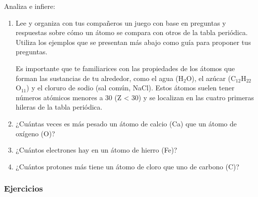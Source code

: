 \begin{minipage}{\textwidth}
    \begin{boxK}
        Analiza e infiere:
        \begin{enumerate}
            \item Lee y organiza con tus compañeros un juego con base en preguntas y respuestas sobre cómo un átomo se compara
                  con otros de la tabla periódica. Utiliza los ejemplos que se presentan más abajo como guía para proponer tus preguntas.

                  \begin{boxF}
                      Es importante que te familiarices con las propiedades de los átomos que forman las sustancias de tu alrededor,
                      como el agua (H$_2$O), el azúcar (C$_{12}$H$_{22}$O$_{11}$) y el cloruro de sodio (sal común, NaCl).
                      Estos átomos suelen tener números atómicos menores a 30 (Z < 30) y se localizan en las cuatro primeras hileras de
                      la tabla periódica.
                  \end{boxF}
            \item ¿Cuántas veces es más pesado un átomo de calcio (Ca) que un átomo de oxígeno (O)?
            \item ¿Cuántos electrones hay en un átomo de hierro (Fe)?
            \item ¿Cuántos protones más tiene un átomo de cloro que uno de carbono (C)?
        \end{enumerate}
    \end{boxK}
\end{minipage}

\newpage
\subsubsection{Ejercicios}

